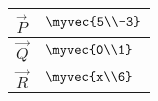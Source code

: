 \begin{table}[H]
\centering
\renewcommand{\arraystretch}{1.5}
\begin{tabular}{|m{1cm}|m{1cm}|}
\hline
  $\vec{P}$   &  $\myvec{5\\-3}$ \\ \hline 
  $\vec{Q}$   &  $\myvec{0\\1}$ \\ \hline
  $\vec{R}$   &  $\myvec{x\\6}$ \\ \hline
\end{tabular}
\end{table}